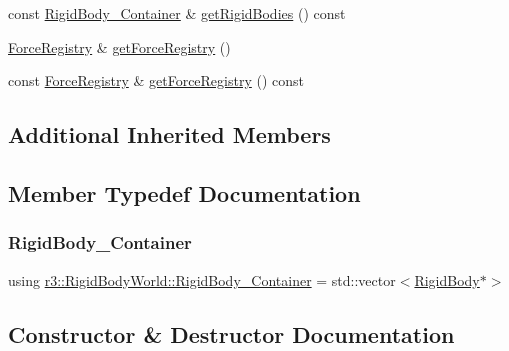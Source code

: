 \begin{DoxyCompactItemize}
\item 
const \mbox{\hyperlink{classr3_1_1_rigid_body_world_abe8c123eee198b6f8eca079e71302bcb}{Rigid\+Body\+\_\+\+Container}} \& \mbox{\hyperlink{classr3_1_1_rigid_body_world_abf3bfd4b5d7ed2e843362e555b9eebb2}{get\+Rigid\+Bodies}} () const
\item 
\mbox{\hyperlink{classr3_1_1_force_registry}{Force\+Registry}} \& \mbox{\hyperlink{classr3_1_1_rigid_body_world_acfdc56e2796e5e0d86dbf71582e1b8c2}{get\+Force\+Registry}} ()
\item 
const \mbox{\hyperlink{classr3_1_1_force_registry}{Force\+Registry}} \& \mbox{\hyperlink{classr3_1_1_rigid_body_world_a5ec345de8bdc6e910797434de918dbc2}{get\+Force\+Registry}} () const
\end{DoxyCompactItemize}
\subsection*{Additional Inherited Members}


\subsection{Member Typedef Documentation}
\mbox{\label{classr3_1_1_rigid_body_world_abe8c123eee198b6f8eca079e71302bcb}} 
\subsubsection{\texorpdfstring{Rigid\+Body\+\_\+\+Container}{RigidBody\_Container}}
{\footnotesize\ttfamily using \mbox{\hyperlink{classr3_1_1_rigid_body_world_abe8c123eee198b6f8eca079e71302bcb}{r3\+::\+Rigid\+Body\+World\+::\+Rigid\+Body\+\_\+\+Container}} =  std\+::vector$<$\mbox{\hyperlink{classr3_1_1_rigid_body}{Rigid\+Body}}$\ast$$>$}



\subsection{Constructor \& Destructor Documentation}
\mbox{\label{classr3_1_1_rigid_body_world_ae9358def6c2b1ea21d38059242fec505}} 
